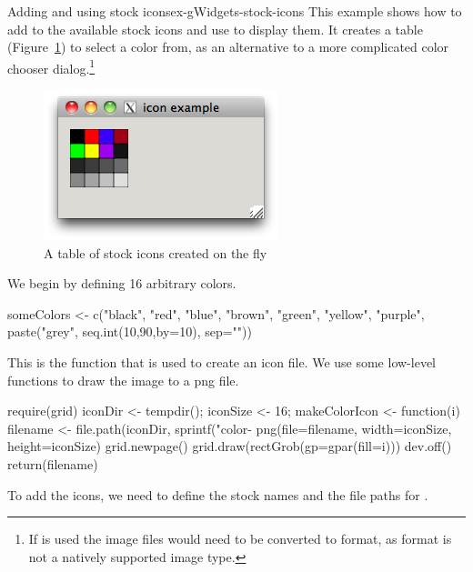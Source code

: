 \begin{example}{Adding and using stock icons}{ex-gWidgets-stock-icons}
This example shows how to add to the available stock icons and use
 to display them. It creates a table
(Figure~\ref{fig:gWidgets-stock-icons}) to select a color from, as an
alternative to a more complicated color chooser dialog.\footnote{If
   is used the image files would need to be
  converted to  format, as  format is not a
  natively supported image type.}

\begin{figure}
  \centering
  \includegraphics[width=.5\textwidth]{fig-gWidgets-icon-example.png}
  \caption{A table of stock icons created on the fly}
  \label{fig:gWidgets-stock-icons}
\end{figure}

We begin by defining 16 arbitrary colors.

\begin{Schunk}
\begin{Sinput}
 someColors <- c("black", "red", "blue", "brown",
                 "green", "yellow", "purple",
                 paste("grey", seq.int(10,90,by=10), sep=""))
\end{Sinput}
\end{Schunk}

This is the function that is used to create an icon file. We use some
low-level  functions to draw the image to a png file.
\begin{Schunk}
\begin{Sinput}
 require(grid)
 iconDir <- tempdir(); iconSize <- 16;
 makeColorIcon <- function(i) {
   filename <- file.path(iconDir, 
                         sprintf("color-%
   png(file=filename, width=iconSize, height=iconSize)
   grid.newpage()
   grid.draw(rectGrob(gp=gpar(fill=i)))
   dev.off()
   return(filename)
 }
\end{Sinput}
\end{Schunk}

To add the icons, we need to define the stock names and the file paths
for .


\end{example}
